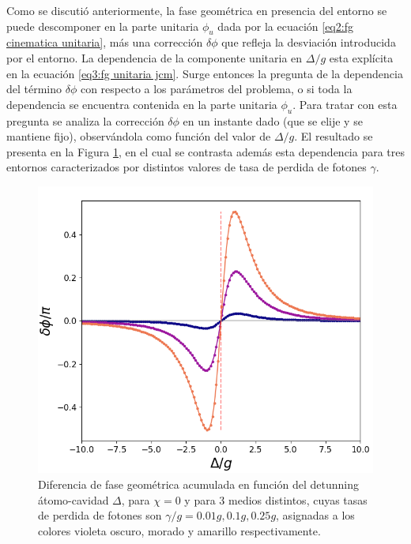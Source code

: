 Como se discutió anteriormente, la fase geométrica en presencia del entorno se puede descomponer en la parte unitaria $\phi_u$ dada por la ecuación \ref{eq2:fg cinematica unitaria}, más una corrección $\delta\phi$ que refleja la desviación introducida por el entorno. La dependencia de la componente unitaria en $\Delta/g$ esta explícita en la ecuación \ref{eq3:fg unitaria jcm}. Surge entonces la pregunta de la dependencia del término $\delta\phi$ con respecto a los parámetros del problema, o si toda la dependencia se encuentra contenida en la parte unitaria $\phi_u$. Para tratar con esta pregunta se analiza la corrección $\delta\phi$ en un instante dado (que se elije y se mantiene fijo), observándola como función del valor de $\Delta/g$. El resultado se presenta en la Figura \ref{fig3:robustez 0}, en el cual se contrasta además esta dependencia para tres entornos caracterizados por distintos valores de tasa de perdida de fotones $\gamma$.
\begin{figure}[H]
    \begin{minipage}[c]{0.67\textwidth}
        \includegraphics[width=\textwidth]{figuras/ch3/robustez.png}
    \end{minipage}\hfill
    \begin{minipage}[c]{0.3\textwidth}
    \caption{Diferencia de fase geométrica acumulada en función del detunning átomo-cavidad $\Delta$, para $\chi=0$ y para 3 medios distintos, cuyas tasas de perdida de fotones son $\gamma/g=0.01g,0.1g,0.25g$, asignadas a los colores violeta oscuro, morado y amarillo respectivamente.}
    \label{fig3:robustez 0}
  \end{minipage}
\end{figure}
